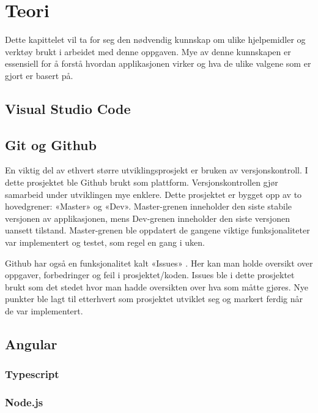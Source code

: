 \chapter{Teori}
\label{teori} %
Dette kapittelet vil ta for seg den nødvendig kunnskap om ulike hjelpemidler og verktøy brukt i arbeidet med denne oppgaven. Mye av denne kunnskapen er essensiell for å forstå hvordan applikasjonen virker og hva de ulike valgene som er gjort er basert på.

\section{Visual Studio Code}

\section{Git og Github}
En viktig del av ethvert større utviklingsprosjekt er bruken av versjonskontroll. I dette prosjektet ble Github brukt som plattform. Versjonskontrollen gjør samarbeid under utviklingen mye enklere. Dette prosjektet er bygget opp av to hovedgrener: «Master» og «Dev». Master-grenen inneholder den siste stabile versjonen av applikasjonen, mens Dev-grenen inneholder den siste versjonen uansett tilstand. Master-grenen ble oppdatert de gangene viktige funksjonaliteter var implementert og testet, som regel en gang i uken.

Github har også en funksjonalitet kalt «Issues» \cite{githubIssues}. Her kan man holde oversikt over oppgaver, forbedringer og feil i prosjektet/koden. Issues ble i dette prosjektet brukt som det stedet hvor man hadde oversikten over hva som måtte gjøres. Nye punkter ble lagt til etterhvert som prosjektet utviklet seg og markert ferdig når de var implementert.

\section{Angular}
\subsection{Typescript}
\subsection{Node.js}

